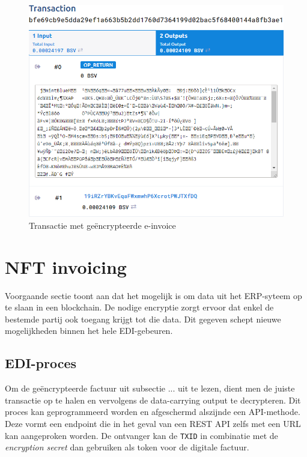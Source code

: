 \begin{figure}[H]
	\centering
	\includegraphics[width=\linewidth]{img/proof-of-concept/transactie-encryptie.png}
	\caption{\label{fig:transactie-encryptie}Transactie met geëncrypteerde e-invoice}
\end{figure}


\section{NFT invoicing}

Voorgaande sectie toont aan dat het mogelijk is om data uit het ERP-syteem op te slaan in een blockchain. De nodige encryptie zorgt ervoor dat enkel de bestemde partij ook toegang krijgt tot die data. Dit gegeven schept nieuwe mogelijkheden binnen het hele EDI-gebeuren.

\subsection{EDI-proces}
\label{sub:werking}

Om de geëncrypteerde factuur uit subsectie ... uit te lezen, dient men de juiste transactie op te halen en vervolgens de data-carrying output te decrypteren. Dit proces kan geprogrammeerd worden en afgeschermd alszijnde een API-methode. Deze vormt een endpoint die in het geval van een REST API zelfs met een URL kan aangeproken worden. De ontvanger kan de \verb|TXID| in combinatie met de \textit{encryption secret} dan gebruiken als token voor de digitale factuur.


